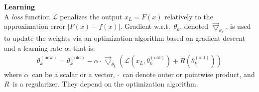 \begin{remark}\textbf{Learning}\\
A \emph{loss} function $\mathcal{L}$ penalizes the output $x_L = F(x)$ relatively to the approximation error $|F(x) - f(x)|$. Gradient w.r.t.~$\theta_k$, denoted $\vec{\bigtriangledown}_{\theta_k}$, is used to update the weights via an optimization algorithm based on gradient descent and a learning rate $\alpha$, that is:
\begin{gather}
\theta_k^{(\text{new})} = \theta_k^{(\text{old})} - \alpha \cdot \vec{\bigtriangledown}_{\theta_k} \left( \mathcal{L}\left( x_L, \theta_k^{(\text{old})} \right) + R\left( \theta_k^{(\text{old})} \right) \right)
\end{gather}
where $\alpha$~can be a scalar or a vector, $\cdot$~can denote outer or pointwise product, and $R$~is a regularizer. They depend on the optimization algorithm.
\end{remark}


